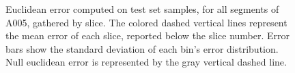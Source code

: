 \begin{figure}
\centering
{}
\caption{Euclidean error computed on test set samples, for all segments of A005, gathered by slice. The colored dashed vertical lines represent the mean error of each slice, reported below the slice number. Error bars show the standard deviation of each bin's error distribution. Null euclidean error is represented by the gray vertical dashed line.}
\label{fig:3d_err_per_slice_seg}       %
\end{figure}

